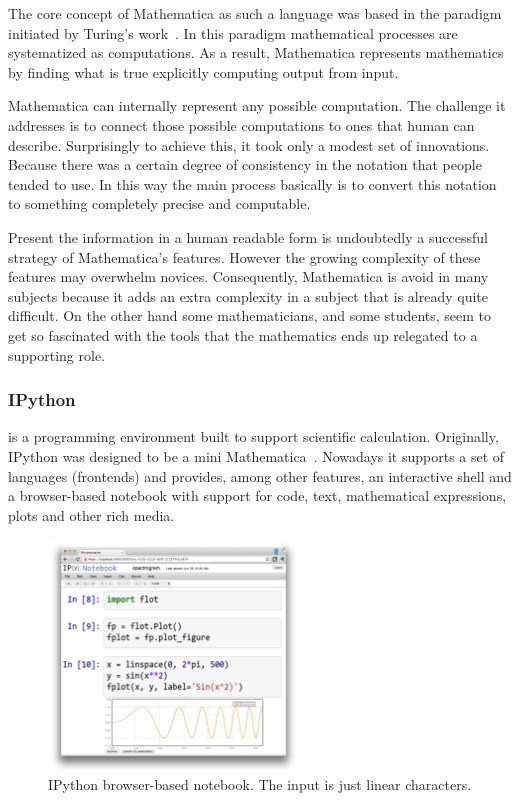 The core concept of Mathematica as such a language was based in the paradigm initiated by Turing's work~\cite{wolfram2003wolfram}. In this paradigm mathematical processes are systematized as computations. As a result, Mathematica represents mathematics by finding what is true explicitly computing output from input. 

Mathematica can internally represent any possible computation. The challenge it addresses is to connect those possible computations to ones that human can describe. Surprisingly to achieve this, it took only a modest set of innovations. Because there was a certain degree of consistency in the notation that people tended to use. In this way the main process basically is to convert this notation to something completely precise and computable. 

Present the information in a human readable form is undoubtedly a successful strategy of Mathematica's features. However the growing complexity of these features may overwhelm novices. Consequently, Mathematica is avoid in many subjects because it adds an extra complexity in a subject that is already quite difficult. On the other hand some mathematicians, and some students, seem to get so fascinated with the tools that the mathematics ends up relegated to a supporting role.
\subsubsection{IPython~\cite{PER-GRA:2007}} is a programming environment built to support scientific calculation. Originally, IPython was designed to be a mini Mathematica~\cite{wolfram1991mathematica}. Nowadays it supports a set of languages (frontends) and provides, among other features, an interactive shell and a browser-based notebook with support for code, text, mathematical expressions, plots and other rich media. 

\begin{figure}
  \vspace{-35pt}
  \begin{center}
    \includegraphics[width=0.6\textwidth]{img/ipython-zoom}
  \end{center}
  \vspace{-25pt}
 \caption{IPython browser-based notebook. The input is just linear characters.}  
  \vspace{-15pt}
    \label{fig:ipython}
\end{figure}

